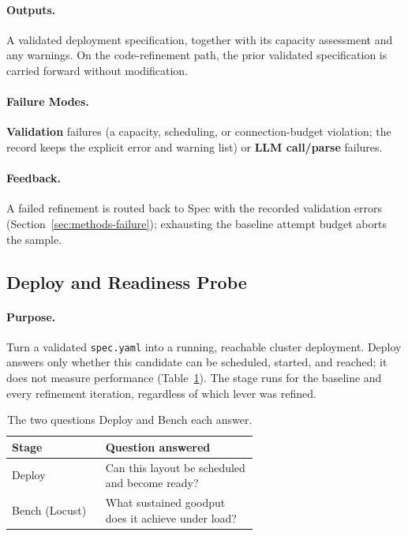 \paragraph{Outputs.}
A validated deployment specification, together with its capacity assessment
and any warnings. On the code-refinement path, the prior validated
specification is carried forward without modification.

\paragraph{Failure Modes.}
\textbf{Validation} failures (a capacity, scheduling, or connection-budget
violation; the record keeps the explicit error and warning list) or
\textbf{LLM call/parse} failures.

\paragraph{Feedback.}
A failed refinement is routed back to Spec with the recorded validation
errors (Section~\ref{sec:methods-failure}); exhausting the baseline attempt
budget aborts the sample.

\FloatBarrier

\subsection{Deploy and Readiness Probe}
\label{sec:methods-deploy}

\paragraph{Purpose.}
Turn a validated \texttt{spec.yaml} into a running, reachable cluster
deployment. Deploy answers only whether this candidate can be scheduled,
started, and reached; it does not measure performance
(Table~\ref{tab:deploy-vs-bench}). The stage runs for the baseline and every
refinement iteration, regardless of which lever was refined.

\begin{table}[t]
  \centering
  \caption{The two questions Deploy and Bench each answer.}
  \label{tab:deploy-vs-bench}
  \small
  \begin{tabular}{@{}lp{0.62\linewidth}@{}}
    \toprule
    \textbf{Stage} & \textbf{Question answered} \\
    \midrule
    Deploy & Can this layout be scheduled and become ready? \\
    Bench (Locust) & What sustained goodput does it achieve under load? \\
    \bottomrule
  \end{tabular}
\end{table}

